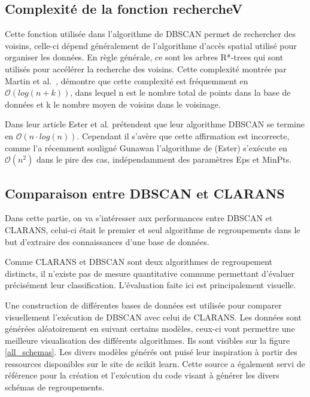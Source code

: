 \documentclass[
  oneside]{memoire-umons}
\begin{document}
\hypertarget{complexituxe9-de-la-fonction-recherchev}{%
\subsection{Complexité de la fonction
rechercheV}\label{complexituxe9-de-la-fonction-recherchev}}

Cette fonction utilisée dans l'algorithme de DBSCAN permet de rechercher
des voisins, celle-ci dépend généralement de l'algorithme d'accès
spatial utilisé pour organiser les données. En règle générale, ce sont
les arbres R*-trees qui sont utilisés pour accélérer la recherche des
voisins. Cette complexité montrée par Martin et
al.~, démontre que cette complexité est fréquemment
en \(\mathcal{O}(log (n + k))\), dans lequel n est le nombre total de
points dans la base de données et k le nombre moyen de voisins dans le
voisinage.

Dans leur article Ester et al. prétendent que leur
algorithme DBSCAN se termine en \(\mathcal{O}(n\cdot log (n))\).
Cependant il s'avère que cette affirmation est incorrecte, comme l'a
récemment souligné Gunawan l'algorithme de
(Ester) s'exécute en \(\mathcal{O}(n^2)\) dans le
pire des cas, indépendamment des paramètres Eps et MinPts.

\hypertarget{comparaison-entre-dbscan-et-clarans}{%
\subsection{Comparaison entre DBSCAN et
CLARANS}\label{comparaison-entre-dbscan-et-clarans}}

Dans cette partie, on va s'intéresser aux performances entre DBSCAN et
CLARANS, celui-ci était le premier et seul algorithme de regroupements
dans le but d'extraire des connaissances d'une base de données.

Comme CLARANS et DBSCAN sont deux algorithmes de regroupement distincts,
il n'existe pas de mesure quantitative commune permettant d'évaluer
précisément leur classification. L'évaluation faite ici est
principalement visuelle.

Une construction de différentes bases de données est utilisée pour
comparer visuellement l'exécution de DBSCAN avec celui de CLARANS. Les
données sont générées aléatoirement en suivant certains modèles, ceux-ci
vont permettre une meilleure visualisation des différents algorithmes.
Ils sont visibles sur la figure \ref{all_schemas}. Les divers modèles
générés ont puisé leur inspiration à partir des ressources disponibles
sur le site de scikit learn. Cette
source a également servi de référence pour la création et l'exécution du
code visant à générer les divers schémas de regroupements.
\end{document}
